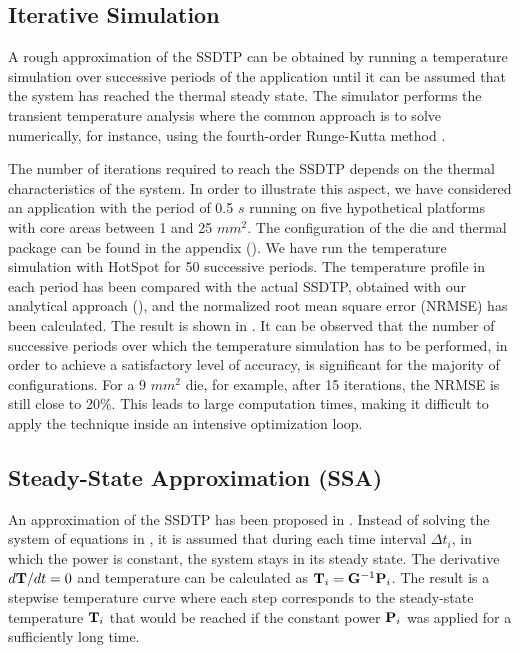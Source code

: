 \subsection{Iterative Simulation} \label{sec:hotspot-iterative-solution}
A rough approximation of the SSDTP can be obtained by running a temperature simulation over successive periods of the application until it can be assumed that the system has reached the thermal steady state. The simulator performs the transient temperature analysis where the common approach is to solve  numerically, for instance, using the fourth-order Runge-Kutta method \cite{press2007}.

The number of iterations required to reach the SSDTP depends on the thermal characteristics of the system. In order to illustrate this aspect, we have considered an application with the period of 0.5 $s$ running on five hypothetical platforms with core areas between 1 and 25 $mm^2$. The configuration of the die and thermal package can be found in the appendix (). We have run the temperature simulation with HotSpot \cite{huang2003} for 50 successive periods. The temperature profile in each period has been compared with the actual SSDTP, obtained with our analytical approach (), and the normalized root mean square error (NRMSE) has been calculated. The result is shown in . It can be observed that the number of successive periods over which the temperature simulation has to be performed, in order to achieve a satisfactory level of accuracy, is significant for the majority of configurations. For a 9 $mm^2$ die, for example, after 15 iterations, the NRMSE is still close to 20\%. This leads to large computation times, making it difficult to apply the technique inside an intensive optimization loop.

\subsection{Steady-State Approximation (SSA)} \label{sec:steady-state-approximation}
An approximation of the SSDTP has been proposed in \cite{huang2009}. Instead of solving the system of equations in , it is assumed that during each time interval $\Delta t_i$, in which the power is constant, the system stays in its steady state. The derivative $d\mathbf{T}/dt = 0$ and temperature can be calculated as $\mathbf{T}_i = \mathbf{G}^{-1} \mathbf{P}_i$. The result is a stepwise temperature curve where each step corresponds to the steady-state temperature $\mathbf{T}_i$ that would be reached if the constant power $\mathbf{P}_i$ was applied for a sufficiently long time.

